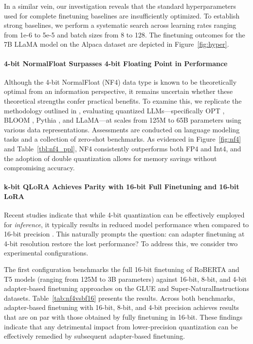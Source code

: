 In a similar vein, our investigation reveals that the standard hyperparameters used for complete finetuning baselines are insufficiently optimized. To establish strong baselines, we perform a systematic search across learning rates ranging from 1e-6 to 5e-5 and batch sizes from 8 to 128. The finetuning outcomes for the 7B LLaMA model on the Alpaca dataset are depicted in Figure~\ref{fig:hyper}.

\paragraph{4-bit NormalFloat Surpasses 4-bit Floating Point in Performance} 

Although the 4-bit NormalFloat (NF4) data type is known to be theoretically optimal from an information perspective, it remains uncertain whether these theoretical strengths confer practical benefits. To examine this, we replicate the methodology outlined in \citet{dettmers2022case}, evaluating quantized LLMs—specifically OPT \citep{zhang2022opt}, BLOOM \cite{scao2022bloom}, Pythia \cite{biderman2023pythia}, and LLaMA—at scales from 125M to 65B parameters using various data representations. Assessments are conducted on language modeling tasks and a collection of zero-shot benchmarks. As evidenced in Figure~\ref{fig:nf4} and Table~\ref{tbl:nf4_ppl}, NF4 consistently outperforms both FP4 and Int4, and the adoption of double quantization allows for memory savings without compromising accuracy.

\paragraph{k-bit \textsc{QLoRA} Achieves Parity with 16-bit Full Finetuning and 16-bit LoRA} Recent studies indicate that while 4-bit quantization can be effectively employed for \emph{inference}, it typically results in reduced model performance when compared to 16-bit precision \citep{dettmers2022case,frantar2022gptq}. This naturally prompts the question: can adapter finetuning at 4-bit resolution restore the lost performance? To address this, we consider two experimental configurations.

The first configuration benchmarks the full 16-bit finetuning of RoBERTA and T5 models (ranging from 125M to 3B parameters) against 16-bit, 8-bit, and 4-bit adapter-based finetuning approaches on the GLUE and Super-NaturalInstructions datasets. Table~\ref{tab:nf4vsbf16} presents the results. Across both benchmarks, adapter-based finetuning with 16-bit, 8-bit, and 4-bit precision achieves results that are on par with those obtained by fully finetuning in 16-bit. These findings indicate that any detrimental impact from lower-precision quantization can be effectively remedied by subsequent adapter-based finetuning.

